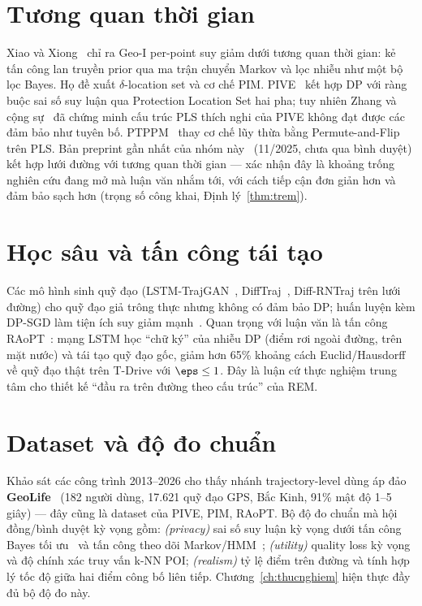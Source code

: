 \section{Tương quan thời gian}

Xiao và Xiong~\cite{xiao2015protecting} chỉ ra Geo-I per-point suy giảm dưới
tương quan thời gian: kẻ tấn công lan truyền prior qua ma trận chuyển Markov và
lọc nhiễu như một bộ lọc Bayes. Họ đề xuất $\delta$-location set và cơ chế PIM.
PIVE~\cite{yu2017pive} kết hợp DP với ràng buộc sai số suy luận qua Protection
Location Set hai pha; tuy nhiên Zhang và cộng sự~\cite{zhang2021pive} đã chứng
minh cấu trúc PLS thích nghi của PIVE không đạt được các đảm bảo như tuyên bố.
PTPPM~\cite{cao2024ptppm} thay cơ chế lũy thừa bằng Permute-and-Flip trên PLS.
Bản preprint gần nhất của nhóm này~\cite{min2025road} (11/2025, chưa qua bình
duyệt) kết hợp lưới đường với tương quan thời gian --- xác nhận đây là khoảng
trống nghiên cứu đang mở mà luận văn nhắm tới, với cách tiếp cận đơn giản hơn
và đảm bảo sạch hơn (trọng số công khai, Định lý~\ref{thm:trem}).

\section{Học sâu và tấn công tái tạo}

Các mô hình sinh quỹ đạo (LSTM-TrajGAN~\cite{rao2020lstm},
DiffTraj~\cite{zhu2023difftraj}, Diff-RNTraj trên lưới đường) cho quỹ đạo giả
trông thực nhưng không có đảm bảo DP; huấn luyện kèm DP-SGD làm tiện ích suy giảm
mạnh~\cite{buchholz2024sok}. Quan trọng với luận văn là tấn công
RAoPT~\cite{buchholz2022raopt}: mạng LSTM học ``chữ ký'' của nhiễu DP (điểm rơi
ngoài đường, trên mặt nước) và tái tạo quỹ đạo gốc, giảm hơn 65\% khoảng cách
Euclid/Hausdorff về quỹ đạo thật trên T-Drive với $\eps \le 1$. Đây là luận cứ
thực nghiệm trung tâm cho thiết kế ``đầu ra trên đường theo cấu trúc'' của REM.

\section{Dataset và độ đo chuẩn}
\label{sec:datasetmetrics}

Khảo sát các công trình 2013--2026 cho thấy nhánh trajectory-level dùng áp đảo
\textbf{GeoLife}~\cite{zheng2010geolife} (182 người dùng, 17.621 quỹ đạo GPS,
Bắc Kinh, 91\% mật độ 1--5 giây) --- đây cũng là dataset của PIVE, PIM, RAoPT.
Bộ độ đo chuẩn mà hội đồng/bình duyệt kỳ vọng gồm: \emph{(privacy)} sai số suy
luận kỳ vọng dưới tấn công Bayes tối ưu~\cite{shokri2011quantifying} và tấn công
theo dõi Markov/HMM~\cite{xiao2015protecting}; \emph{(utility)} quality loss kỳ
vọng và độ chính xác truy vấn k-NN POI; \emph{(realism)} tỷ lệ điểm trên đường và
tính hợp lý tốc độ giữa hai điểm công bố liên tiếp. Chương~\ref{ch:thucnghiem}
hiện thực đầy đủ bộ độ đo này.

